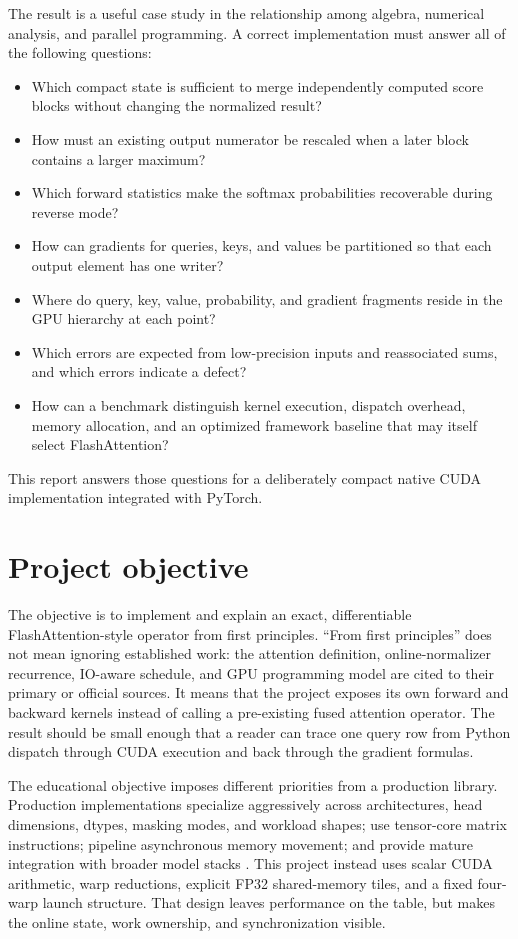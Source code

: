 The result is a useful case study in the relationship among algebra, numerical analysis, and parallel programming. A correct implementation must answer all of the following questions:
\begin{itemize}
  \item Which compact state is sufficient to merge independently computed score blocks without changing the normalized result?
  \item How must an existing output numerator be rescaled when a later block contains a larger maximum?
  \item Which forward statistics make the softmax probabilities recoverable during reverse mode?
  \item How can gradients for queries, keys, and values be partitioned so that each output element has one writer?
  \item Where do query, key, value, probability, and gradient fragments reside in the GPU hierarchy at each point?
  \item Which errors are expected from low-precision inputs and reassociated sums, and which errors indicate a defect?
  \item How can a benchmark distinguish kernel execution, dispatch overhead, memory allocation, and an optimized framework baseline that may itself select FlashAttention?
\end{itemize}

This report answers those questions for a deliberately compact native CUDA implementation integrated with PyTorch.

\section{Project objective}

The objective is to implement and explain an exact, differentiable FlashAttention-style operator from first principles. ``From first principles'' does not mean ignoring established work: the attention definition, online-normalizer recurrence, IO-aware schedule, and GPU programming model are cited to their primary or official sources. It means that the project exposes its own forward and backward kernels instead of calling a pre-existing fused attention operator. The result should be small enough that a reader can trace one query row from Python dispatch through CUDA execution and back through the gradient formulas.

The educational objective imposes different priorities from a production library. Production implementations specialize aggressively across architectures, head dimensions, dtypes, masking modes, and workload shapes; use tensor-core matrix instructions; pipeline asynchronous memory movement; and provide mature integration with broader model stacks \citep{dao2024flashattention2,shah2024flashattention3,flashattentionrepo}. This project instead uses scalar CUDA arithmetic, warp reductions, explicit FP32 shared-memory tiles, and a fixed four-warp launch structure. That design leaves performance on the table, but makes the online state, work ownership, and synchronization visible.

